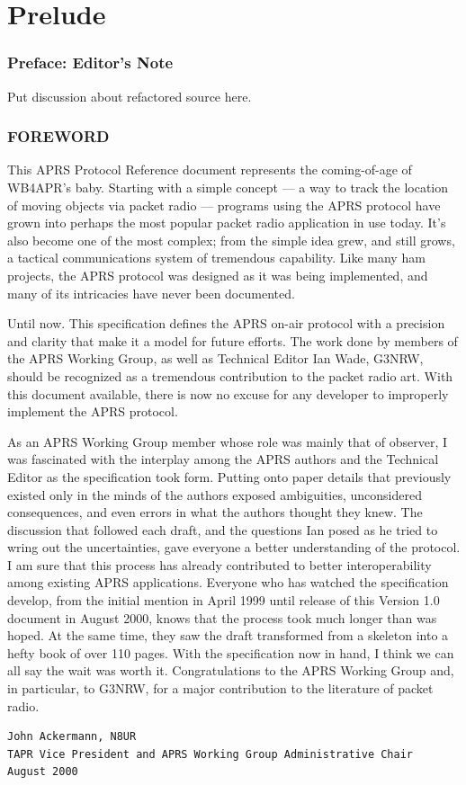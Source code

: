 
\part*{Prelude}

\section*{Preface: Editor's Note}
Put discussion about refactored source here.


\newpage

\section*{FOREWORD}

This APRS Protocol Reference document represents the coming-of-age of
WB4APR’s baby.  Starting with a simple concept — a way to track the
location of moving objects via packet radio — programs using the APRS
protocol have grown into perhaps the most popular packet radio
application in use today. It’s also become one of the most complex;
from the simple idea grew, and still grows, a tactical communications
system of tremendous capability. Like many ham projects, the APRS
protocol was designed as it was being implemented, and many of its
intricacies have never been documented.

Until now. This specification defines the APRS on-air protocol with a
precision and clarity that make it a model for future efforts. The
work done by members of the APRS Working Group, as well as Technical
Editor Ian Wade, G3NRW, should be recognized as a tremendous
contribution to the packet radio art. With this document available,
there is now no excuse for any developer to improperly implement the
APRS protocol.

As an APRS Working Group member whose role was mainly that of
observer, I was fascinated with the interplay among the APRS authors
and the Technical Editor as the specification took form. Putting onto
paper details that previously existed only in the minds of the authors
exposed ambiguities, unconsidered consequences, and even errors in
what the authors thought they knew.  The discussion that followed each
draft, and the questions Ian posed as he tried to wring out the
uncertainties, gave everyone a better understanding of the protocol. I
am sure that this process has already contributed to better
interoperability among existing APRS applications.  Everyone who has
watched the specification develop, from the initial mention in April
1999 until release of this Version 1.0 document in August 2000, knows
that the process took much longer than was hoped. At the same time,
they saw the draft transformed from a skeleton into a hefty book of
over 110 pages. With the specification now in hand, I think we can all
say the wait was worth it. Congratulations to the APRS Working Group
and, in particular, to G3NRW, for a major contribution to the
literature of packet radio.

\begin{verbatim}
John Ackermann, N8UR
TAPR Vice President and APRS Working Group Administrative Chair
August 2000
\end{verbatim}


